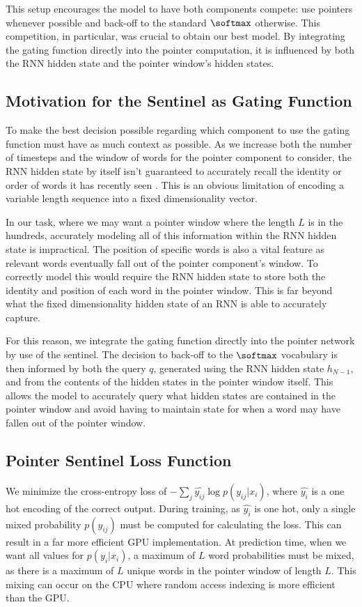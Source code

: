 This setup encourages the model to have both components compete: use pointers whenever possible and back-off to the standard $\softmax$ otherwise. This competition, in particular, was crucial to obtain our best model. By integrating the gating function directly into the pointer computation, it is influenced by both the RNN hidden state and the pointer window's hidden states.

\subsection{Motivation for the Sentinel as Gating Function} To make the best decision possible regarding which component to use the gating function must have as much context as possible. As we increase both the number of timesteps and the window of words for the pointer component to consider, the RNN hidden state by itself isn't guaranteed to accurately recall the identity or order of words it has recently seen \cite{Adi2016}. This is an obvious limitation of encoding a variable length sequence into a fixed dimensionality vector.

In our task, where we may want a pointer window where the length $L$ is in the hundreds, accurately modeling all of this information within the RNN hidden state is impractical. The position of specific words is also a vital feature as relevant words eventually fall out of the pointer component's window. To correctly model this would require the RNN hidden state to store both the identity and position of each word in the pointer window. This is far beyond what the fixed dimensionality hidden state of an RNN is able to accurately capture.

For this reason, we integrate the gating function directly into the pointer network by use of the sentinel. The decision to back-off to the $\softmax$ vocabulary is then informed by both the query $q$, generated using the RNN hidden state $h_{N-1}$, and from the contents of the hidden states in the pointer window itself. This allows the model to accurately query what hidden states are contained in the pointer window and avoid having to maintain state for when a word may have fallen out of the pointer window.

\subsection{Pointer Sentinel Loss Function} We minimize the cross-entropy loss of $-\sum_{j} \hat{y_{ij}} \log p(y_{ij}|x_i)$, where $\hat{y_{i}}$ is a one hot encoding of the correct output. During training, as $\hat{y_{i}}$ is one hot, only a single mixed probability $p(y_{ij})$ must be computed for calculating the loss. This can result in a far more efficient GPU implementation. At prediction time, when we want all values for $p(y_i|x_i)$, a maximum of $L$ word probabilities must be mixed, as there is a maximum of $L$ unique words in the pointer window of length $L$. This mixing can occur on the CPU where random access indexing is more efficient than the GPU.

